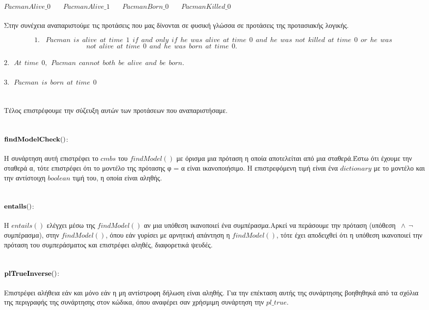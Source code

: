 \documentclass[10pt]{article}
\begin{document}
\hspace{20mm} $PacmanAlive\_0$  \ \ \ 
$PacmanAlive\_1$  \ \ \ 
$PacmanBorn\_0$  \ \ \ 
$PacmanKilled\_0$ \\ \\
Στην συνέχεια αναπαριστούμε τις προτάσεις που μας δίνονται σε φυσική γλώσσα σε προτάσεις της προτασιακής λογικής.

\[ 1.\ \  \ \ Pacman \ \ is \ \ alive \ \  at \ \ time \ \ 1 \ \ if \ \ and \ \ only \ \ if \ \ he \ \ was \ \ alive \ \ at \ \ time \ \ 0 \ \ and \ \ he \ \ was \ \ not \ \ killed \ \ at \ \ time \ \ 0 \ \ or \ \ he \ \ was \ \ 
\]
\[ \ \ not \ \ alive \ \ at \ \  time \ \  0 \  \ and \ \ he \ \ was \ \ born \ \ at \ \ time \ \ 0. \ \ \ \ \ \ \ \ \ \ \ \ \ \ \ \ \ \ \ \ \ \ \ \ \ \ \ \ \ \ \ \ \ \ \ \ \ \ \ \ \ \ \ \ \ \ \ \ \ \ \ \ \ \ \ \ \ \ \ \ \ \ \ \ \ \ \ \ \ \ \ \ \] \\
$2. \  \ \  At \ \ time\ \  0,\ \  Pacman \ \ cannot \ \ both \ \ be \ \ alive \ \ and\ \  be \ \ born.$ \\ \\
$3. \  \ \  Pacman \ \ is \ \  born \ \ at \ \ time \ \ 0$ \\ \\ \\
Τέλος επιστρέφουμε την σύζευξη αυτών των προτάσεων που αναπαριστήσαμε.\\ \\ \\
\underline{\underline{$\bf findModelCheck()$}}: \\  \\ 
Η συνάρτηση αυτή επιστρέφει το $cmbs$ του $findModel()$ με όρισμα μια πρόταση η οποία αποτελείται από μια σταθερά.Έστω ότι έχουμε την σταθερά α, τότε επιστρέφει ότι το μοντέλο της πρότασης φ = α είναι ικανοποιήσιμο. Η επιστρεφόμενη τιμή είναι ένα $dictionary$ με το μοντέλο και την αντίστοιχη $boolean$ τιμή του, η οποία είναι αληθής.\\ \\ \\
\underline{\underline{$\bf entails()$}}: \\  \\ 
Η $entails()$ ελέγχει μέσω της $ findModel()$ αν μια υπόθεση ικανοποιεί ένα συμπέρασμα.Αρκεί να περάσουμε την πρόταση  (υπόθεση $\ \wedge \  \neg$ συμπέρασμα), στην $ findModel()$, όπου εάν γυρίσει με αρνητική απάντηση η $ findModel()$, τότε έχει αποδειχθεί ότι η υπόθεση ικανοποιεί την πρόταση του συμπεράσματος και επιστρέφει αληθές, διαφορετικά ψευδές.
\\ \\ \\
\underline{\underline{$\bf plTrueInverse()$}}: \\  \\ 
Επιστρέφει αλήθεια εάν και μόνο εάν η μη αντίστροφη δήλωση είναι αληθής. Για την επέκταση αυτής της συνάρτησης βοηθηθηκά από τα σχόλια της περιγραφής της συνάρτησης στον κώδικα, όπου αναφέρει σαν χρήσμιμη συνάρτηση την $pl\_true$.
\\ \\ \\ 
\end{document}
